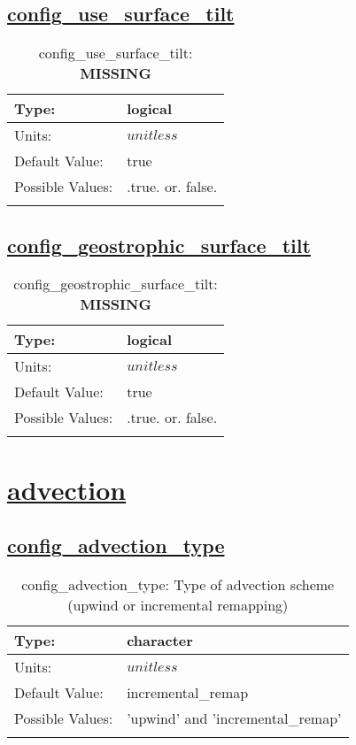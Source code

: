 \subsection[config\_use\_surface\_tilt]{\hyperref[sec:nm_tab_velocity_solver]{config\_use\_surface\_tilt}}
\label{subsec:nm_sec_config_use_surface_tilt}
\begin{center}
\begin{longtable}{| p{2.0in} || p{4.0in} |}
    \hline
    Type: & logical \\
    \hline
    Units: & $unitless$ \\
    \hline
    Default Value: & true \\
    \hline
    Possible Values: & .true. or. false. \\
    \hline
    \caption{config\_use\_surface\_tilt: {\bf \color{red} MISSING}}
\end{longtable}
\end{center}
\subsection[config\_geostrophic\_surface\_tilt]{\hyperref[sec:nm_tab_velocity_solver]{config\_geostrophic\_surface\_tilt}}
\label{subsec:nm_sec_config_geostrophic_surface_tilt}
\begin{center}
\begin{longtable}{| p{2.0in} || p{4.0in} |}
    \hline
    Type: & logical \\
    \hline
    Units: & $unitless$ \\
    \hline
    Default Value: & true \\
    \hline
    Possible Values: & .true. or. false. \\
    \hline
    \caption{config\_geostrophic\_surface\_tilt: {\bf \color{red} MISSING}}
\end{longtable}
\end{center}
\section[advection]{\hyperref[sec:nm_tab_advection]{advection}}
\label{sec:nm_sec_advection}
\subsection[config\_advection\_type]{\hyperref[sec:nm_tab_advection]{config\_advection\_type}}
\label{subsec:nm_sec_config_advection_type}
\begin{center}
\begin{longtable}{| p{2.0in} || p{4.0in} |}
    \hline
    Type: & character \\
    \hline
    Units: & $unitless$ \\
    \hline
    Default Value: & incremental\_remap \\
    \hline
    Possible Values: & 'upwind' and 'incremental\_remap' \\
    \hline
    \caption{config\_advection\_type: Type of advection scheme (upwind or incremental remapping)}
\end{longtable}
\end{center}
